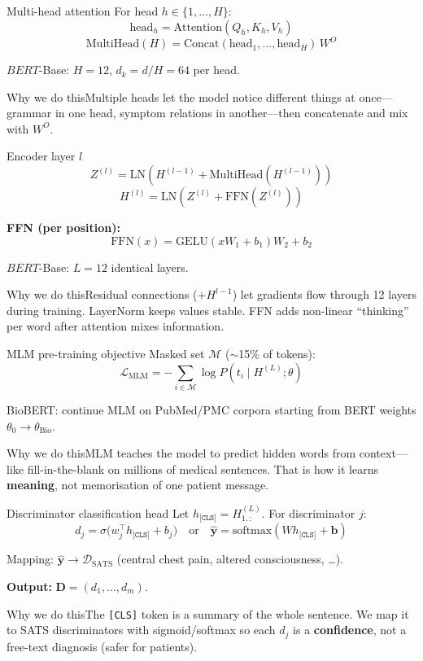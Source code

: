 \documentclass[aspectratio=169,11pt]{beamer}
\newcommand{\why}[1]{\begin{block}{Why we do this}\small #1\end{block}}
\begin{document}
\begin{frame}{Multi-head attention}
	For head $h \in \{1,\ldots,H\}$:
	\[
	\mathrm{head}_h = \mathrm{Attention}(Q_h, K_h, V_h)
	\]
	\[
	\mathrm{MultiHead}(H) = \mathrm{Concat}(\mathrm{head}_1,\ldots,\mathrm{head}_H)\, W^O
	\]

	$BERT$-Base: $H=12$, $d_k = d/H = 64$ per head.

	\why{Multiple heads let the model notice different things at once---grammar in one head, symptom relations in another---then concatenate and mix with $W^O$.}
\end{frame}

\begin{frame}{Encoder layer $l$}
	\[
	Z^{(l)} = \mathrm{LN}\!\left(H^{(l-1)} + \mathrm{MultiHead}(H^{(l-1)})\right)
	\]
	\[
	H^{(l)} = \mathrm{LN}\!\left(Z^{(l)} + \mathrm{FFN}(Z^{(l)})\right)
	\]

	\textbf{FFN (per position):}
	\[
	\mathrm{FFN}(x) = \mathrm{GELU}(x W_1 + b_1) W_2 + b_2
	\]

	$BERT$-Base: $L=12$ identical layers.

	\why{Residual connections ($+H^{l-1}$) let gradients flow through 12 layers during training. LayerNorm keeps values stable. FFN adds non-linear ``thinking'' per word after attention mixes information.}
\end{frame}

\begin{frame}{MLM pre-training objective}
	Masked set $\mathcal{M}$ ($\sim$15\% of tokens):
	\[
	\mathcal{L}_{\text{MLM}} = -\sum_{i \in \mathcal{M}} \log P(t_i \mid H^{(L)};\theta)
	\]

	BioBERT: continue MLM on PubMed/PMC corpora starting from BERT weights $\theta_0 \to \theta_{\text{Bio}}$.

	\why{MLM teaches the model to predict hidden words from context---like fill-in-the-blank on millions of medical sentences. That is how it learns \textbf{meaning}, not memorisation of one patient message.}
\end{frame}

\begin{frame}{Discriminator classification head}
	Let $h_{\texttt{[CLS]}} = H^{(L)}_{1,:}$. For discriminator $j$:
	\[
	d_j = \sigma\!\bigl(w_j^\top h_{\texttt{[CLS]}} + b_j\bigr)
	\quad\text{or}\quad
	\hat{\mathbf{y}} = \mathrm{softmax}(W h_{\texttt{[CLS]}} + \mathbf{b})
	\]

	Mapping: $\hat{\mathbf{y}} \to \mathcal{D}_{\text{SATS}}$ (central chest pain, altered consciousness, \ldots).

	\textbf{Output:} $\mathbf{D} = (d_1,\ldots,d_m)$.

	\why{The \texttt{[CLS]} token is a summary of the whole sentence. We map it to SATS discriminators with sigmoid/softmax so each $d_j$ is a \textbf{confidence}, not a free-text diagnosis (safer for patients).}
\end{frame}
\end{document}
